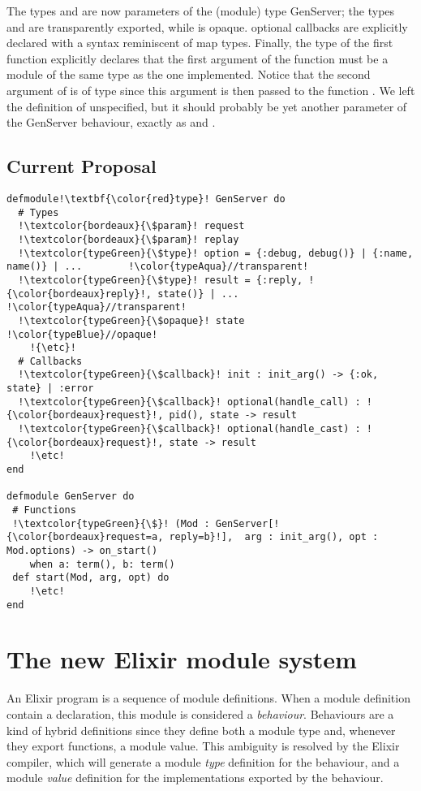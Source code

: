 \documentclass[a4paper,10pt]{article}
\begin{document}
The types  and  are now parameters of the (module) type GenServer; the types  and  are transparently exported, while  is opaque. optional callbacks are explicitly declared with a syntax reminiscent of map types. Finally, the type of the  first  function explicitly declares that the first argument of the  function must be a module of the same type as the one implemented. Notice that the second argument of  is of type  since this argument is then passed to the function . We left the definition of  unspecified, but it should probably be yet another parameter of the GenServer behaviour, exactly as   and .  



\subsection{Current Proposal}


\begin{verbatim}
defmodule!\textbf{\color{red}type}! GenServer do
  # Types
  !\textcolor{bordeaux}{\$param}! request
  !\textcolor{bordeaux}{\$param}! replay
  !\textcolor{typeGreen}{\$type}! option = {:debug, debug()} | {:name, name()} | ...        !\color{typeAqua}//transparent!
  !\textcolor{typeGreen}{\$type}! result = {:reply, !{\color{bordeaux}reply}!, state()} | ...                   !\color{typeAqua}//transparent!
  !\textcolor{typeGreen}{\$opaque}! state                                                   !\color{typeBlue}//opaque!
    !{\etc}!
  # Callbacks
  !\textcolor{typeGreen}{\$callback}! init : init_arg() -> {:ok, state} | :error      
  !\textcolor{typeGreen}{\$callback}! optional(handle_call) : !{\color{bordeaux}request}!, pid(), state -> result
  !\textcolor{typeGreen}{\$callback}! optional(handle_cast) : !{\color{bordeaux}request}!, state -> result        
    !\etc!
end

defmodule GenServer do
 # Functions
 !\textcolor{typeGreen}{\$}! (Mod : GenServer[!{\color{bordeaux}request=a, reply=b}!],  arg : init_arg(), opt : Mod.options) -> on_start()
    when a: term(), b: term()
 def start(Mod, arg, opt) do
    !\etc!
end
\end{verbatim}


\section{The new Elixir module system}
An Elixir program is a sequence of module definitions. When a module definition contain a  declaration, this module is considered a \emph{behaviour}. Behaviours are a kind of hybrid definitions since they define both a module type and, whenever they export functions, a module value. This ambiguity is resolved by the Elixir compiler, which will generate a module \emph{type} definition for the behaviour, and a module \emph{value} definition for the implementations exported by the behaviour.
\end{document}
